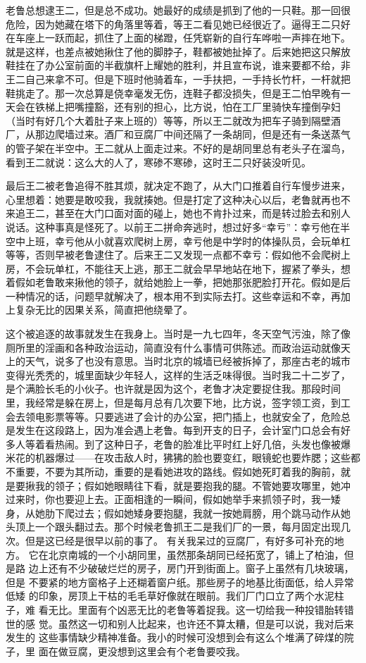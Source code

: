 老鲁总想逮王二，但是总不成功。她最好的成绩是抓到了他的一只鞋。那一回很
危险，因为她藏在塔下的角落里等着，等王二看见她已经很近了。逼得王二只好
在车座上一跃而起，抓住了上面的梯蹬，任凭崭新的自行车哗啦一声摔在地下。
就是这样，也差点被她揪住了他的脚脖子，鞋都被她扯掉了。后来她把这只解放
鞋挂在了办公室前面的半截旗杆上耀她的胜利，并且宣布说，谁来要都不给，非
王二自己来拿不可。但是下班时他骑着车，一手扶把，一手持长竹杆，一杆就把
鞋挑走了。那一次总算是侥幸毫发无伤，连鞋子都没损失，但是王二怕早晚有一
天会在铁梯上把嘴撞豁，还有别的担心，比方说，怕在工厂里骑快车撞倒孕妇
（当时有好几个大着肚子来上班的）等等，所以王二就改为把车子骑到隔壁酒
厂，从那边爬墙过来。酒厂和豆腐厂中间还隔了一条胡同，但是还有一条送蒸气
的管子架在半空中。王二就从上面走过来。不好的是胡同里总有老头子在溜鸟，
看到王二就说：这么大的人了，寒碜不寒碜，这时王二只好装没听见。

最后王二被老鲁追得不胜其烦，就决定不跑了，从大门口推着自行车慢步进来，
心里想着：她要是敢咬我，我就揍她。但是打定了这种决心以后，老鲁就再也不
来追王二，甚至在大门口面对面的碰上，她也不肯扑过来，而是转过脸去和别人
说话。这种事真是怪死了。以前王二拼命奔逃时，想过好多“幸亏”：幸亏他在半
空中上班，幸亏他从小就喜欢爬树上房，幸亏他是中学时的体操队员，会玩单杠
等等，否则早被老鲁逮住了。后来王二又发现一点都不幸亏：假如他不会爬树上
房，不会玩单杠，不能往天上逃，那王二就会早早地站在地下，握紧了拳头，想
着假如老鲁敢来揪他的领子，就给她脸上一拳，把她那张肥脸打开花。假如是后
一种情况的话，问题早就解决了，根本用不到实际去打。这些幸运和不幸，再加
上复杂无比的因果关系，简直把他绕晕了。

这个被追逐的故事就发生在我身上。当时是一九七四年，冬天空气污浊，除了像
厕所里的淫画和各种政治运动，简直没有什么事情可供陈述。而政治运动就像天
上的天气，说多了也没有意思。当时北京的城墙已经被拆掉了，那座古老的城市
变得光秃秃的，城里面缺少年轻人，这样的生活乏味得很。当时我二十二岁了，
是个满脸长毛的小伙子。也许就是因为这个，老鲁才决定要捉住我。那段时间
里，我经常是躲在房上，但是每月总有几次要下地，比方说，签字领工资，到工
会去领电影票等等。只要逃进了会计的办公室，把门插上，也就安全了，危险总
是发生在这段路上，因为准会遇上老鲁。每到开支的日子，会计室门口总会有好
多人等着看热闹。到了这种日子，老鲁的脸准比平时红上好几倍，头发也像被爆
米花的机器爆过——在攻击敌人时，狒狒的脸也要变红，眼镜蛇也要炸腮；这些都
不重要，不要为其所动，重要的是看她进攻的路线。假如她死盯着我的胸前，就
是要揪我的领子；假如她眼睛往下看，就是要抱我的腿。不管她要攻哪里，她冲
过来时，你也要迎上去。正面相逢的一瞬间，假如她举手来抓领子时，我一矮
身，从她肋下爬过去；假如她矮身要抱腿，我就一按她肩膀，用个跳马动作从她
头顶上一个跟头翻过去。那个时候老鲁抓王二是我们厂的一景，每月固定出现几
次。但是这已经是很早以前的事了。 有关我呆过的豆腐厂，有好多可补充的地方。
它在北京南城的一个小胡同里，虽然那条胡同已经拓宽了，铺上了柏油，但是路
边上还有不少破破烂烂的房子，房门开到街面上。窗子上虽然有几块玻璃，但是
不要紧的地方窗格子上还糊着窗户纸。那些房子的地基比街面低，给人异常低矮
的印象，房顶上干枯的毛毛草好像就在眼前。我们厂门口立了两个水泥柱子，难
看无比。里面有个凶恶无比的老鲁等着捉我。这一切给我一种投错胎转错世的感
觉。虽然这一切和别人比起来，也许还不算太糟，但是可以说，我对后来发生的
这些事情缺少精神准备。我小的时候可没想到会有这么个堆满了碎煤的院子，里
面在做豆腐，更没想到这里会有个老鲁要咬我。

